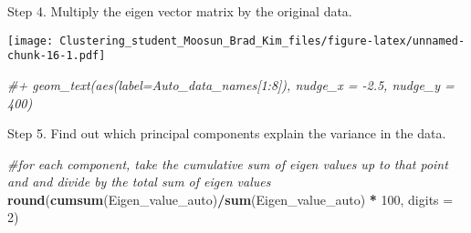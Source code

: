 \documentclass[11pt,]{article}
\newenvironment{Shaded}{\begin{snugshade}}{\end{snugshade}}
\newcommand{\CommentTok}[1]{\textcolor[rgb]{0.56,0.35,0.01}{\textit{#1}}}
\newcommand{\DataTypeTok}[1]{\textcolor[rgb]{0.13,0.29,0.53}{#1}}
\newcommand{\DecValTok}[1]{\textcolor[rgb]{0.00,0.00,0.81}{#1}}
\newcommand{\KeywordTok}[1]{\textcolor[rgb]{0.13,0.29,0.53}{\textbf{#1}}}
\newcommand{\NormalTok}[1]{#1}
\newcommand{\OperatorTok}[1]{\textcolor[rgb]{0.81,0.36,0.00}{\textbf{#1}}}
\newcommand{\StringTok}[1]{\textcolor[rgb]{0.31,0.60,0.02}{#1}}
\begin{document}
\begin{Shaded}
\end{Shaded}

Step 4. Multiply the eigen vector matrix by the original data.

\begin{Shaded}
\end{Shaded}

\texttt{[image: Clustering\_student\_Moosun\_Brad\_Kim\_files/figure-latex/unnamed-chunk-16-1.pdf]}

\begin{Shaded}
\begin{Highlighting}[]
\CommentTok{#+ geom_text(aes(label=Auto_data_names[1:8]), nudge_x = -2.5, nudge_y = 400)}
\end{Highlighting}
\end{Shaded}

Step 5. Find out which principal components explain the variance in the
data.

\begin{Shaded}
\begin{Highlighting}[]
\CommentTok{#for each component, take the cumulative sum of eigen values up to that point and and divide by the total sum of eigen values}
\KeywordTok{round}\NormalTok{(}\KeywordTok{cumsum}\NormalTok{(Eigen_value_auto)}\OperatorTok{/}\KeywordTok{sum}\NormalTok{(Eigen_value_auto) }\OperatorTok{*}\StringTok{ }\DecValTok{100}\NormalTok{, }\DataTypeTok{digits =} \DecValTok{2}\NormalTok{)}
\end{Highlighting}
\end{Shaded}
\end{document}
